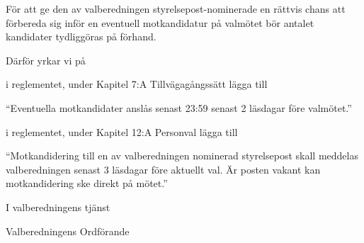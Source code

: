\documentclass[../_main/handlingar.tex]{subfiles}
\begin{document}

För att ge den av valberedningen styrelsepost-nominerade en rättvis chans att förbereda sig inför en eventuell motkandidatur på valmötet bör antalet kandidater tydliggöras på förhand.


Därför yrkar vi på
\begin{attsatser}
    \att i reglementet, under Kapitel 7:A Tillvägagångssätt lägga till \par
    \begin{itshape}
        ``Eventuella motkandidater anslås senast 23:59 senast 2 läsdagar före valmötet.''
    \end{itshape}
    \att i reglementet, under Kapitel 12:A Personval lägga till \par
    \begin{itshape}
        ``Motkandidering till en av valberedningen nominerad styrelsepost skall meddelas valberedningen senast 3 läsdagar före aktuellt val. Är posten vakant kan motkandidering ske direkt på mötet.''
    \end{itshape}
\end{attsatser}

\begin{signatures}{1}
    I valberedningens tjänst
    \signature{Elin Magnusson}{Valberedningens Ordförande}
\end{signatures}
\end{document}
